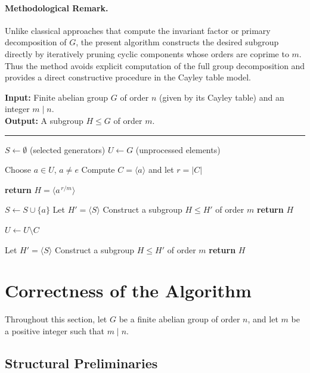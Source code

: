 \documentclass[11pt]{article}
\begin{document}
	\paragraph{Methodological Remark.}
	Unlike classical approaches that compute the invariant factor or primary decomposition of $G$, the present algorithm constructs the desired subgroup directly by iteratively pruning cyclic components whose orders are coprime to $m$. Thus the method avoids explicit computation of the full group decomposition and provides a direct constructive procedure in the Cayley table model.
	
	\begin{algorithm}[H]
		\caption{\textsc{FindSubgroup}$(G,m)$}
		\textbf{Input:} Finite abelian group $G$ of order $n$ (given by its Cayley table) and an integer $m \mid n$. \\
		\textbf{Output:} A subgroup $H \le G$ of order $m$.
		\hrule
		\begin{algorithmic}[1]
			
			\STATE $S \leftarrow \emptyset$ \hfill (selected generators)
			\STATE $U \leftarrow G$ \hfill (unprocessed elements)
			
			\STATE Choose $a \in U$, $a \neq e$
			\STATE Compute $C = \langle a \rangle$ and let $r = |C|$
			
			\STATE \textbf{return} $H = \langle a^{\,r/m} \rangle$
			\ENDIF
			
			\STATE $S \leftarrow S \cup \{a\}$
			\STATE Let $H' = \langle S \rangle$
			\STATE Construct a subgroup $H \le H'$ of order $m$ 
			\STATE \textbf{return} $H$
			\ENDIF
			\ENDIF
			
			\STATE $U \leftarrow U \setminus C$
			\ENDWHILE
			
			\STATE Let $H' = \langle S \rangle$
			\STATE Construct a subgroup $H \le H'$ of order $m$
			\STATE \textbf{return} $H$
			
		\end{algorithmic}
	\end{algorithm}
	\section{Correctness of the Algorithm}
	
	Throughout this section, let $G$ be a finite abelian group of order $n$, and let $m$ be a positive integer such that $m \mid n$.
	
	\subsection{Structural Preliminaries}
	
\end{document}
